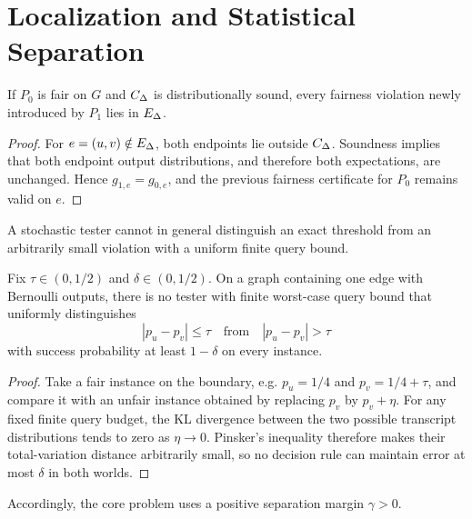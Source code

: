 \section{Localization and Statistical Separation}
\label{sec:localization}

\begin{proposition}
\label{prop:localization}
If $P_0$ is fair on $G$ and $C_{\Delta}$ is distributionally sound, every fairness
violation newly introduced by $P_1$ lies in $E_{\Delta}$.
\end{proposition}

\begin{proof}
For $e=(u,v)\notin E_{\Delta}$, both endpoints lie outside $C_{\Delta}$.  Soundness
implies that both endpoint output distributions, and therefore both expectations,
are unchanged.  Hence $g_{1,e}=g_{0,e}$, and the previous fairness certificate for
$P_0$ remains valid on $e$.
\end{proof}

A stochastic tester cannot in general distinguish an exact threshold from an
arbitrarily small violation with a uniform finite query bound.

\begin{proposition}
\label{prop:zero-margin}
Fix $\tau\in(0,1/2)$ and $\delta\in(0,1/2)$.  On a graph containing one edge with
Bernoulli outputs, there is no tester with finite worst-case query bound that
uniformly distinguishes
\[
|p_u-p_v|\le\tau
\quad\text{from}\quad
|p_u-p_v|>\tau
\]
with success probability at least $1-\delta$ on every instance.
\end{proposition}

\begin{proof}
Take a fair instance on the boundary, e.g. $p_u=1/4$ and
$p_v=1/4+\tau$, and compare it with an unfair instance obtained by replacing
$p_v$ by $p_v+\eta$.  For any fixed finite query budget, the KL divergence between
the two possible transcript distributions tends to zero as $\eta\to0$.  Pinsker's
inequality therefore makes their total-variation distance arbitrarily small, so
no decision rule can maintain error at most $\delta$ in both worlds.
\end{proof}

Accordingly, the core problem uses a positive separation margin $\gamma>0$.
